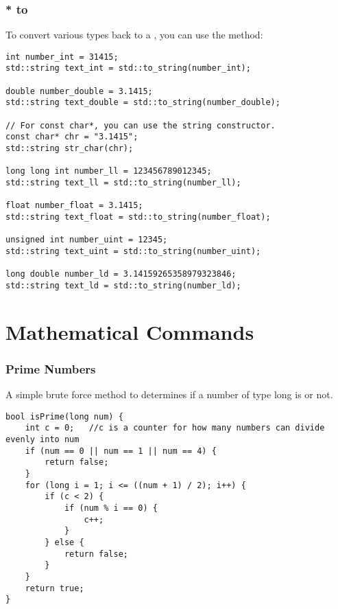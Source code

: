 \subsubsection{* to }

To convert various types back to a , you can use the  method:

\begin{lstlisting}
int number_int = 31415;
std::string text_int = std::to_string(number_int);

double number_double = 3.1415;
std::string text_double = std::to_string(number_double);

// For const char*, you can use the string constructor.
const char* chr = "3.1415";
std::string str_char(chr);

long long int number_ll = 123456789012345;
std::string text_ll = std::to_string(number_ll);

float number_float = 3.1415;
std::string text_float = std::to_string(number_float);

unsigned int number_uint = 12345;
std::string text_uint = std::to_string(number_uint);

long double number_ld = 3.14159265358979323846;
std::string text_ld = std::to_string(number_ld);
\end{lstlisting}
















\section{Mathematical Commands}



\subsubsection{Prime Numbers}

A simple brute force method to determines if a number of type long is  or not.
\begin{lstlisting}
bool isPrime(long num) {  
	int c = 0;   //c is a counter for how many numbers can divide evenly into num
	if (num == 0 || num == 1 || num == 4) {
		return false;
	}
	for (long i = 1; i <= ((num + 1) / 2); i++) {
		if (c < 2) {
			if (num % i == 0) {
				c++;
			}
		} else {
			return false;
		}
	}
	return true;
}
\end{lstlisting}




